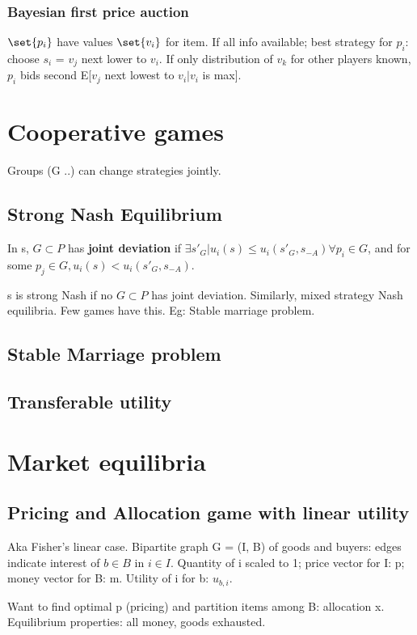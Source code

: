 \documentclass[oneside, article]{memoir}
\begin{document}
\subsubsection{Bayesian first price auction}
$\set{p_{i}}$ have values $\set{v_{i}}$ for item. If all info available; best strategy for $p_{i}$: choose $s_{i}$ = $v_{j}$ next lower to $v_{i}$. If only distribution of $v_{k}$ for other players known, $p_{i}$ bids second E[$v_{j}$ next lowest to $v_{i}|v_{i}$ is max]. \why

\section{Cooperative games}
Groups (G ..) can change strategies jointly.

\subsection{Strong Nash Equilibrium}
In s, $G \subset P$ has \textbf{joint deviation} if $\exists s'_{G}| u_{i}(s) \leq u_{i}(s'_{G}, s_{-A})\forall p_{i} \in G$, and for some $p_{j} \in G, u_{i}(s) < u_{i}(s'_{G}, s_{-A})$.

s is strong Nash if no $G \subset P$ has joint deviation. Similarly, mixed strategy Nash equilibria. Few games have this. Eg: Stable marriage problem.

\subsection{Stable Marriage problem}
\tbc

\subsection{Transferable utility}
\tbc

\section{Market equilibria}
\subsection{Pricing and Allocation game with linear utility}
Aka Fisher's linear case. Bipartite graph G = (I, B) of goods and buyers: edges indicate interest of $b \in B$ in $i \in I$. Quantity of i scaled to 1; price vector for I: p; money vector for B: m. Utility of i for b: $u_{b, i}$.

Want to find optimal p (pricing) and partition items among B: allocation x. Equilibrium properties: all money, goods exhausted.
\end{document}

